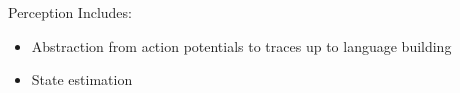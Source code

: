 \begin{frame}[allowframebreaks]{Perception}
    Includes:
    \begin{itemize}
        \item Abstraction from action potentials to traces up to language building
        \item State estimation
    \end{itemize}
\end{frame}